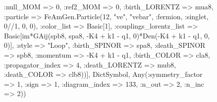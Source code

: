 \documentclass{revtex4}
\begin{document}
\begin{figure}[!htb]
\begin{center}
{:null_MOM => 0, :ref2_MOM => 0, :birth_LORENTZ => mua8, :particle => FeAmGen.Particle(12, "ve", "vebar", :fermion, :singlet, 0//1, 0, 0), :color_list => Basic[1], :couplings_lorentz_list => Basic[im*GAij(spb8, spa8, -K4 + k1 - q1, 0)*Den(-K4 + k1 - q1, 0, 0)], :style => "Loop", :birth_SPINOR => spa8, :death_SPINOR => spb8, :momentum => -K4 + k1 - q1, :birth_COLOR => cla8, :propagator_index => 4, :death_LORENTZ => mub8, :death_COLOR => clb8))], Dict{Symbol, Any}(:symmetry_factor => 1, :sign => 1, :diagram_index => 133, :n_out => 2, :n_inc => 2)) 
}
\end{center}
\end{figure}
\end{document}

